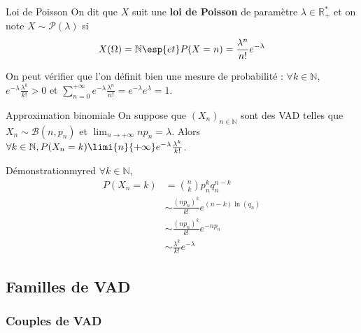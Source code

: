     \begin{defi}{Loi de Poisson}{}
        On dit que $X$ suit une \textbf{loi de Poisson} de paramètre $\lambda \in \mathbb{R}_+^*$ et on note $X \sim \mathcal{P}(\lambda)$ si 
        \[ X(\Omega) = \mathbb{N} \esp{et} P(X = n) = \frac{\lambda^n}{n!} e^{-\lambda} \]   
    \end{defi}

    On peut vérifier que l’on définit bien une mesure de probabilité : $\forall k \in \mathbb{N}$, $e^{-\lambda} \frac{\lambda^k}{k!} > 0$ et $\sum_{n=0}^{+\infty} e^{-\lambda} \frac{\lambda^n}{n!} = e^{-\lambda} e^{\lambda} = 1$.

    \begin{theo}{Approximation binomiale}
        On suppose que $(X_n)_{n \in \mathbb{N}}$ sont des VAD telles que $X_n \sim \mathcal{B}(n,p_n)$ et $\lim_{n \to +\infty} n p_n = \lambda$. Alors $\forall k \in \mathbb{N}, P(X_n = k) \limi{n}{+\infty} e^{-\lambda} \frac{\lambda^k}{k!}$.
    \end{theo}

    \begin{demo}{Démonstration}{myred}
        $\forall k \in \mathbb{N}$, 
        \begin{align*}
            P(X_n = k) &= \binom{n}{k} p_n^k q_n^{n-k} \\
            &\sim \frac{(np_n)^k}{k!} e^{(n-k)\ln(q_n)} \\
            &\sim \frac{(np_n)^k}{k!} e^{-n p_n} \\
            &\sim \frac{\lambda^k}{k!} e^{-\lambda}
        \end{align*}
    \end{demo}

\subsection{Familles de VAD}
    
    \subsubsection{Couples de VAD}

